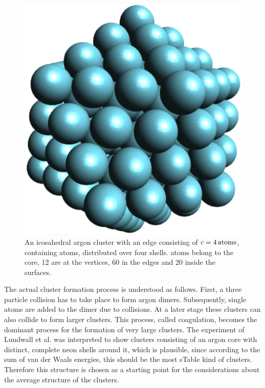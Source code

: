 \begin{figure}[!ht]
 \centering
 \includegraphics[scale=0.5]{pics/Ar_pure.eps}                        
 \caption{An icosahedral argon cluster with an edge consisting of 
          $c=\unit[4]{atoms}$, containing \unit[147]{atoms},
          distributed over four shells. \unit[55]{atoms} belong
          to the core, 12 are at the vertices, 60 in the edges and 20 inside the
          surfaces.}
 \label{figure:Ar_pure}
\end{figure}    

The actual cluster formation process is understood as follows. First, a three particle
collision has to take place to form argon dimers. Subsequently, single atoms are added to the dimer 
due to collisions. At a later stage these clusters can also collide to form larger clusters. This process,
called coagulation, becomes the dominant process for the formation of very large clusters. 
The experiment of Lundwall et al. \cite{Lundwall07} was interpreted to
show clusters consisting of an argon core with distinct, complete neon
shells around it, which is plausible, since according to the sum of van der Waals
energies, this should be the most sTable kind of clusters.
Therefore this structure is chosen as a starting point for the considerations
about the average structure of the clusters.

